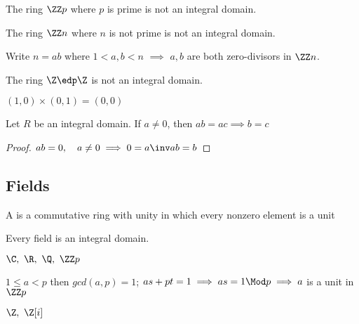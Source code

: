\begin{example}
  The ring \(\ZZ p\) where \(p\) is prime is not an integral domain.
\end{example}

\begin{nonexample}
  The ring \(\ZZ n\) where \(n\) is not prime is not an integral domain.
  \begin{note}
    Write \(n=ab\) where \(1<a,b<n\) \(\implies\) \(a,b\) are both zero-divisors in \(\ZZ n\).
  \end{note}
\end{nonexample}

\begin{nonexample}
  The ring \(\Z \edp \Z\) is not an integral domain.
  \begin{note}
    \((1,0)\times(0,1) = (0,0)\)
  \end{note}
\end{nonexample}

\begin{theorem}[Cancellation]
  Let \(R\) be an integral domain. If \(a\neq 0\), then \(ab=ac\implies b=c\)
\end{theorem}

\begin{proof}
  \(ab = 0,\quad a\neq 0 \implies 0=a\inv ab = b\)
\end{proof}

\subsection{Fields}
\begin{definition}[Field]
  A  is a commutative ring with unity in which every nonzero element is a unit
\end{definition}

\begin{fact}
  Every field is an integral domain.
\end{fact}

\begin{examples}
  \(\C,\ \R,\ \Q,\ \ZZ p\)
  \begin{note}[\(\ZZ p\)]
    \(1\leq a < p\) then \(gcd(a,p) = 1\); \(as+pt=1 \implies as = 1 \Mod p \implies a\) is a unit in \(\ZZ p\)
  \end{note}
\end{examples}

\begin{nonexamples}
  \(\Z,\ \Z[i]\)
\end{nonexamples}

